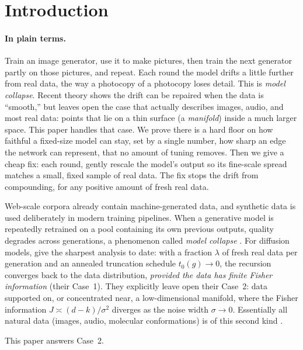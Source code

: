 \documentclass[11pt]{article}
\theoremstyle{remark}
\newcommand{\sigsq}{\sigma^2}
\begin{document}
\section{Introduction}\label{sec:intro}

\paragraph{In plain terms.} Train an image generator, use it to make pictures, then train
the next generator partly on those pictures, and repeat. Each round the model drifts a
little further from real data, the way a photocopy of a photocopy loses detail. This is
\emph{model collapse}. Recent theory shows the drift can be repaired when the data is
``smooth,'' but leaves open the case that actually describes images, audio, and most real
data: points that lie on a thin surface (a \emph{manifold}) inside a much larger space.
This paper handles that case. We prove there is a hard floor on how faithful a
fixed-size model can stay, set by a single number, how sharp an edge the network can
represent, that no amount of tuning removes. Then we give a cheap fix: each round, gently
rescale the model's output so its fine-scale spread matches a small, fixed sample of real
data. The fix stops the drift from compounding, for any positive amount of fresh real data.

Web-scale corpora already contain machine-generated data, and synthetic data is used
deliberately in modern training pipelines. When a generative model is repeatedly
retrained on a pool containing its own previous outputs, quality degrades across
generations, a phenomenon called \emph{model collapse}
\citep{shumailov2024nature,alemohammad2024mad,bertrand2024stability,dohmatob2024tale}.
For diffusion models, \citet{khelifa2026recursive} give the sharpest analysis to date:
with a fraction $\lambda$ of fresh real data per generation and an annealed truncation
schedule $t_0(g)\to0$, the recursion converges back to the data distribution,
\emph{provided the data has finite Fisher information} (their Case~1). They explicitly
leave open their Case~2: data supported on, or concentrated near, a low-dimensional
manifold, where the Fisher information $J\asymp(d-k)/\sigsq$ diverges as the noise width
$\sigma\to0$. Essentially all natural data (images, audio, molecular conformations) is
of this second kind \citep{fefferman2016testing,pidstrigach2022manifold}.

This paper answers Case~2.
\end{document}
